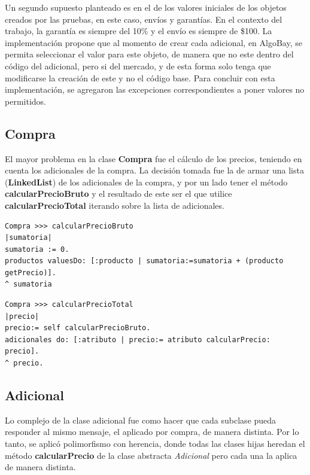 \documentclass[titlepage,a4paper]{article}
\begin{document}
Un segundo supuesto planteado es en el de los valores iniciales de los objetos creados por las pruebas, en este caso, envíos y garantías. En el contexto del trabajo, la garantía es siempre del 10\% y el envío es siempre de \$100. La implementación propone que al momento de crear cada adicional, en AlgoBay, se permita seleccionar el valor para este objeto, de manera que no este dentro del código del adicional, pero si del mercado, y de esta forma solo tenga que modificarse la creación de este y no el código base. Para concluir con esta implementación, se agregaron las excepciones correspondientes a poner valores no permitidos.


\subsection{Compra}
El mayor problema en la clase \textbf{Compra} fue el cálculo de los precios, teniendo en cuenta los adicionales de la compra. La decisión tomada fue la de armar una lista (\textbf{LinkedList}) de los adicionales de la compra, y por un lado tener el método \textbf{calcularPrecioBruto} y el resultado de este ser el que utilice \textbf{calcularPrecioTotal} iterando sobre la lista de adicionales.

\begin{verbatim}
Compra >>> calcularPrecioBruto
|sumatoria|
sumatoria := 0.
productos valuesDo: [:producto | sumatoria:=sumatoria + (producto getPrecio)].
^ sumatoria
\end{verbatim}


\begin{verbatim}
Compra >>> calcularPrecioTotal
|precio|
precio:= self calcularPrecioBruto.
adicionales do: [:atributo | precio:= atributo calcularPrecio: precio].
^ precio.
\end{verbatim}

\subsection{Adicional}
Lo complejo de la clase adicional fue como hacer que cada subclase pueda responder al mismo mensaje, el aplicado por compra, de manera distinta. Por lo tanto, se aplicó polimorfismo con herencia, donde todas las clases hijas heredan el método \textbf{calcularPrecio} de la clase abstracta \textit{Adicional} pero cada una la aplica de manera distinta.
\end{document}
